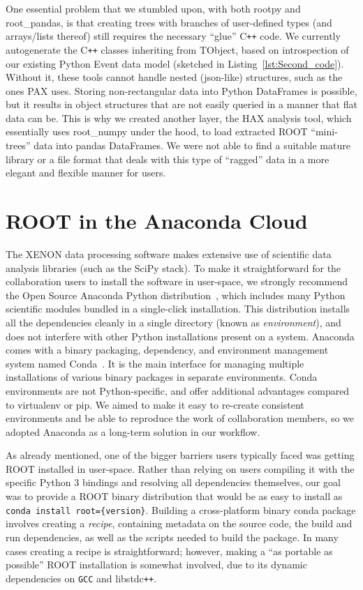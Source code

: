 \documentclass[a4paper]{jpconf}
\begin{document}
One essential problem that we stumbled upon, with both rootpy and root\_pandas, is that creating trees with branches 
of user-defined types (and arrays/lists thereof) still requires the necessary ``glue''  C\texttt{++} code. 
We currently autogenerate the C\texttt{++} classes inheriting from TObject, based on introspection of our existing Python Event data model (sketched in Listing~\ref{lst:Second_code}).
Without it, these tools cannot handle nested (json-like) structures, such as the ones PAX uses.
Storing non-rectangular data into Python DataFrames is possible, but it results in object structures that are not easily queried in a manner that flat data 
can be. This is why we created another layer, the HAX analysis tool, which essentially uses root\_numpy under the hood, to load extracted ROOT ``mini-trees'' data into pandas DataFrames.
We were not able to find a suitable mature library or a file format that deals with this type of ``ragged'' data in a more elegant and flexible manner for users.


\section{ROOT in the Anaconda Cloud}
\label{sec:ROOT_Anaconda}

The XENON data processing software makes extensive use of scientific data analysis libraries (such as the SciPy stack).
To make it straightforward for the collaboration users to install the software in user-space,
we strongly recommend the Open Source Anaconda Python distribution~\cite{Anaconda_distribution}, which includes many Python scientific modules
bundled in a single-click installation. This distribution installs all the dependencies cleanly in a single directory (known as \textit{environment}),
and does not interfere with other Python installations present on a system. 
Anaconda comes with a binary packaging, dependency, and environment management system named Conda~\cite{conda}.
It is the main interface for managing multiple installations of various binary packages in separate environments.
Conda environments are not Python-specific, and offer additional advantages compared to virtualenv or pip. 
We aimed to make it easy to re-create consistent environments and be able to reproduce the work of collaboration members, so we adopted Anaconda as a long-term solution in our workflow.

As already mentioned, one of the bigger barriers users typically faced was getting ROOT installed in user-space. Rather 
than relying on users compiling it with the specific Python 3 bindings and resolving all dependencies themselves,
our goal was to provide a ROOT binary distribution that would be as easy to install as \texttt{conda install root=\{version\}}.
Building a cross-platform binary conda package involves creating a \textit{recipe}, containing metadata on the source code, the build and run dependencies, as well as the scripts 
needed to build the package. In many cases creating a recipe is straightforward; however, making a ``as portable as possible'' ROOT installation is somewhat involved,
due to its dynamic dependencies on \texttt{GCC} and libstdc\texttt{++}.
\end{document}
